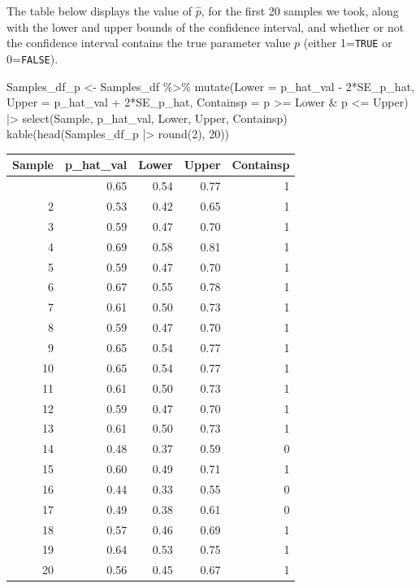 \documentclass[
  letterpaper,
  DIV=11,
  numbers=noendperiod]{scrreprt}
\newenvironment{Shaded}{\begin{snugshade}}{\end{snugshade}}
\newcommand{\AttributeTok}[1]{\textcolor[rgb]{0.40,0.45,0.13}{#1}}
\newcommand{\DecValTok}[1]{\textcolor[rgb]{0.68,0.00,0.00}{#1}}
\newcommand{\FunctionTok}[1]{\textcolor[rgb]{0.28,0.35,0.67}{#1}}
\newcommand{\NormalTok}[1]{\textcolor[rgb]{0.00,0.23,0.31}{#1}}
\newcommand{\OtherTok}[1]{\textcolor[rgb]{0.00,0.23,0.31}{#1}}
\newcommand{\SpecialCharTok}[1]{\textcolor[rgb]{0.37,0.37,0.37}{#1}}
\begin{document}
The table below displays the value of \(\hat{p}\), for the first 20
samples we took, along with the lower and upper bounds of the confidence
interval, and whether or not the confidence interval contains the true
parameter value \(p\) (either 1=\texttt{TRUE} or 0=\texttt{FALSE}).

\begin{Shaded}
\begin{Highlighting}[]
\NormalTok{Samples\_df\_p }\OtherTok{\textless{}{-}}\NormalTok{ Samples\_df }\SpecialCharTok{\%\textgreater{}\%} \FunctionTok{mutate}\NormalTok{(}\AttributeTok{Lower =}\NormalTok{ p\_hat\_val }\SpecialCharTok{{-}} \DecValTok{2}\SpecialCharTok{*}\NormalTok{SE\_p\_hat, }
                                     \AttributeTok{Upper =}\NormalTok{ p\_hat\_val }\SpecialCharTok{+} \DecValTok{2}\SpecialCharTok{*}\NormalTok{SE\_p\_hat,}
                                     \AttributeTok{Containsp =}\NormalTok{ p }\SpecialCharTok{\textgreater{}=}\NormalTok{ Lower }\SpecialCharTok{\&}\NormalTok{ p }\SpecialCharTok{\textless{}=}\NormalTok{ Upper) }\SpecialCharTok{|\textgreater{}}
                              \FunctionTok{select}\NormalTok{(Sample, p\_hat\_val, Lower, Upper, Containsp)  }
\FunctionTok{kable}\NormalTok{(}\FunctionTok{head}\NormalTok{(Samples\_df\_p }\SpecialCharTok{|\textgreater{}} \FunctionTok{round}\NormalTok{(}\DecValTok{2}\NormalTok{), }\DecValTok{20}\NormalTok{))}
\end{Highlighting}
\end{Shaded}

\begin{longtable}[]{@{}rrrrr@{}}
\toprule\noalign{}
Sample & p\_hat\_val & Lower & Upper & Containsp \\
\midrule\noalign{}
\endhead
\bottomrule\noalign{}
\endlastfoot
1 & 0.65 & 0.54 & 0.77 & 1 \\
2 & 0.53 & 0.42 & 0.65 & 1 \\
3 & 0.59 & 0.47 & 0.70 & 1 \\
4 & 0.69 & 0.58 & 0.81 & 1 \\
5 & 0.59 & 0.47 & 0.70 & 1 \\
6 & 0.67 & 0.55 & 0.78 & 1 \\
7 & 0.61 & 0.50 & 0.73 & 1 \\
8 & 0.59 & 0.47 & 0.70 & 1 \\
9 & 0.65 & 0.54 & 0.77 & 1 \\
10 & 0.65 & 0.54 & 0.77 & 1 \\
11 & 0.61 & 0.50 & 0.73 & 1 \\
12 & 0.59 & 0.47 & 0.70 & 1 \\
13 & 0.61 & 0.50 & 0.73 & 1 \\
14 & 0.48 & 0.37 & 0.59 & 0 \\
15 & 0.60 & 0.49 & 0.71 & 1 \\
16 & 0.44 & 0.33 & 0.55 & 0 \\
17 & 0.49 & 0.38 & 0.61 & 0 \\
18 & 0.57 & 0.46 & 0.69 & 1 \\
19 & 0.64 & 0.53 & 0.75 & 1 \\
20 & 0.56 & 0.45 & 0.67 & 1 \\
\end{longtable}
\end{document}
